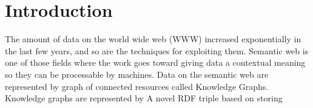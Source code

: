 \chapter{Introduction}
\label{ch:introduction}

The amount of data on the world wide web (WWW) increased exponentially in the last few years, and so are the techniques for exploiting them. Semantic web is one of those fields where the work goes toward giving data a contextual meaning so they can be processable by machines. Data on the semantic web are represented by graph of connected resources called Knowledge Graphs. Knowledge graphs are represented by
A novel RDF triple based on storing